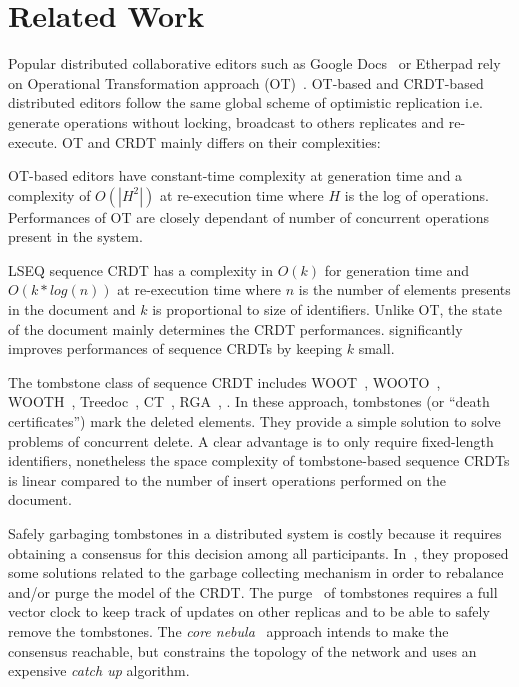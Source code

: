 \section{Related Work}
\label{sec:relatedwork}

Popular distributed collaborative editors such as Google
Docs~\cite{nichols1995high} or Etherpad rely on Operational Transformation
approach (OT)~\cite{sun1998operational,sun1998achieving}.  OT-based and
CRDT-based distributed editors follow the same global scheme of optimistic
replication i.e. generate operations without locking, broadcast to others
replicates and re-execute. OT and CRDT mainly differs on their complexities:
\begin{inparaenum}[(i)]
\item OT-based editors have constant-time complexity at generation time and a
  complexity of $O(|H^{2}|)$ at re-execution time where $H$ is the log of
  operations. Performances of OT are closely dependant of number of concurrent
  operations present in the system.
\item LSEQ sequence CRDT has a complexity in $O(k)$ for generation time and
  $O(k*log(n))$ at re-execution time where $n$ is the number of elements
  presents in the document and $k$ is proportional to size of
  identifiers. Unlike OT, the state of the document mainly determines the CRDT
  performances.  \NAME{} significantly improves performances of sequence CRDTs
  by keeping $k$ small.
\end{inparaenum}

The tombstone class of sequence CRDT includes WOOT~\cite{oster2006data},
WOOTO~\cite{weiss2007wooki}, WOOTH~\cite{ahmed2011evaluating},
Treedoc~\cite{preguica2009commutative}, CT~\cite{grishchenko2010deep},
RGA~\cite{roh2011replicated}, \cite{Yu2012stringwise}. In these approach,
tombstones (or ``death certificates'') mark the deleted elements. They provide
a simple solution to solve problems of concurrent delete. A clear advantage is
to only require fixed-length identifiers, nonetheless the space complexity of
tombstone-based sequence CRDTs is linear compared to the number of insert
operations performed on the document.

Safely garbaging tombstones in a distributed system is costly because it
requires obtaining a consensus for this decision among all participants.
In~\cite{roh2011replicated, letia2009crdts}, they proposed some solutions
related to the garbage collecting mechanism in order to rebalance and/or purge
the model of the CRDT.  The purge~\cite{roh2011replicated} of tombstones
requires a full vector clock to keep track of updates on other replicas and to
be able to safely remove the tombstones. The \emph{core
  nebula}~\cite{letia2009crdts} approach intends to make the consensus
reachable, but constrains the topology of the network and uses an expensive
\emph{catch up} algorithm.

